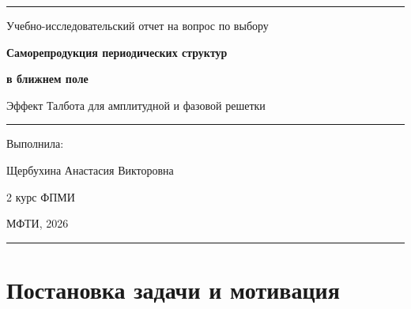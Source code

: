 \documentclass[12pt,a4paper]{article}
\begin{document}
\begin{titlepage}
\centering
\vspace*{12mm}
\rule{\textwidth}{0.7pt}\par
\vspace{8mm}
{\Large Учебно-исследовательский отчет на вопрос по выбору\par}
\vspace{24mm}
{\huge\bfseries Саморепродукция периодических структур\par}
\vspace{3mm}
{\huge\bfseries в ближнем поле\par}
\vspace{8mm}
{\Large Эффект Талбота для амплитудной и фазовой решетки\par}
\vspace{10mm}
\rule{0.66\textwidth}{0.45pt}\par
\vspace{15mm}
\begin{flushright}
{\large Выполнила:\par}
{\Large Щербухина Анастасия Викторовна\par}
{\large 2 курс ФПМИ\par}
\end{flushright}
\vfill
{\large МФТИ, 2026\par}
\vspace{6mm}
\rule{\textwidth}{0.7pt}\par
\end{titlepage}

\tableofcontents
\newpage

\begin{abstract}
В работе изучается эффект Талбота: самовоспроизведение периодических структур при дифракции Френеля. Рассмотрены амплитудные, фазовые и смешанные решетки. Получены основные теоретические формулы, включая параксиальное волновое уравнение, спектральный пропагатор, длину Талбота $z_T=2d^2/\lambda$, сдвиг изображения при $z_T/2$, дробные изображения и точную модель углового спектра. Реализована численная модель на основе дискретного преобразования Фурье, построены ковры Талбота для разных типов решеток, проведены проверки корректности и сравнение параксиальной и точной моделей.
\end{abstract}

\section{Постановка задачи и мотивация}
\end{document}
